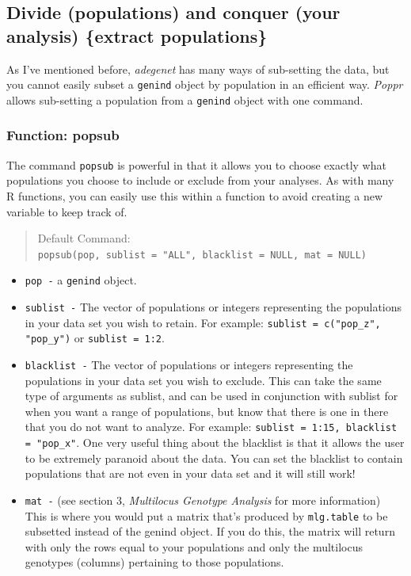 \documentclass[letterpaper]{article}
\newcommand{\tab}{\hspace*{1em}}
\begin{document}
\subsection{Divide (populations) and conquer (your analysis) \{extract populations\}}

\tab\tab As I've mentioned before, \textit{adegenet} has many ways of sub-setting the data, but you cannot easily subset a \texttt{genind} object by population in an efficient way. \textit{Poppr} allows sub-setting a population from a \texttt{genind} object with one command.
\subsubsection{Function: popsub}

\tab\tab The command \texttt{popsub} is powerful in that it allows you to choose exactly what populations you choose to include or exclude from your analyses. As with many R functions, you can easily use this within a function to avoid creating a new variable to keep track of.  
\begin{quote}
Default Command:\\
\texttt{popsub(pop, sublist = "ALL", blacklist = NULL, mat = NULL)}
\end{quote}
\begin{itemize}
  \item \texttt{pop -} a \texttt{genind} object.
  \item \texttt{sublist -} The vector of populations or integers representing the populations in your data set you wish to retain. For example: \texttt{sublist = c("pop\_z", "pop\_y")} or \texttt{sublist = 1:2}.
  \item \texttt{blacklist -} The vector of populations or integers representing the populations in your data set you wish to exclude. This can take the same type of arguments as sublist, and can be used in conjunction with sublist for when you want a range of populations, but know that there is one in there that you do not want to analyze. For example: \texttt{sublist = 1:15, blacklist = "pop\_x"}.
  One very useful thing about the blacklist is that it allows the user to be extremely paranoid about the data. You can set the blacklist to contain populations that are not even in your data set and it will still work!
  \item \texttt{mat -} (see section 3, \textit{Multilocus Genotype Analysis} for more information) This is where you would put a matrix that's produced by \texttt{mlg.table} to be subsetted instead of the genind object. If you do this, the matrix will return with only the rows equal to your populations and only the multilocus genotypes (columns) pertaining to those populations. 
\end{itemize}
\end{document}
